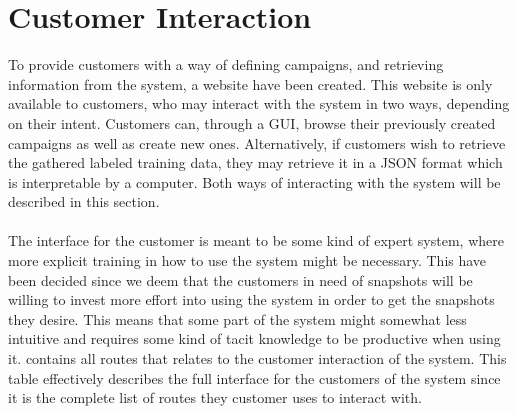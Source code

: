 
\section{Customer Interaction}
\label{sec:customer_interaction}
To provide customers with a way of defining campaigns, and retrieving information from the system, a website have been created. This website is only available to customers, who may interact with the system in two ways, depending on their intent. Customers can, through a GUI, browse their previously created campaigns as well as create new ones. Alternatively, if customers wish to retrieve the gathered labeled training data, they may retrieve it in a JSON format which is interpretable by a computer. Both ways of interacting with the system will be described in this section. 
\\\\
The interface for the customer is meant to be some kind of expert system, where more explicit training in how to use the system might be necessary. This have been decided since we deem that the customers in need of snapshots will be willing to invest more effort into using the system in order to get the snapshots they desire. This means that some part of the system might somewhat less intuitive and requires some kind of tacit knowledge to be productive when using it.  contains all routes that relates to the customer interaction of the system. This table effectively describes the full interface for the customers of the system since it is the complete list of routes they customer uses to interact with.


